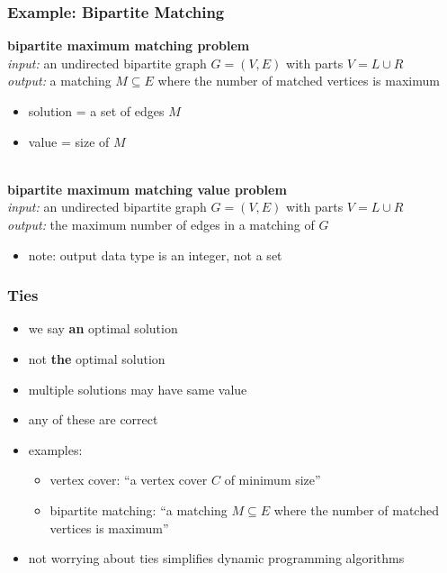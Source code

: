 \documentclass{beamer}
\newcommand{\stanza}{ \\~\ }
\begin{document}
\begin{frame} \frametitle{Example: Bipartite Matching}
  \textbf{bipartite maximum matching problem} \\
  \emph{input:} an undirected bipartite graph $G=(V, E)$ with parts $V=L \cup R$ \\
  \emph{output:} a matching $M \subseteq E$ where the number of matched vertices
    is maximum    
  \begin{itemize}
    \item solution = a set of edges $M$
    \item value = size of $M$ \stanza
  \end{itemize}
  
  \textbf{bipartite maximum matching value problem} \\
  \emph{input:} an undirected bipartite graph $G=(V, E)$ with parts $V=L \cup R$ \\
  \emph{output:} the maximum number of edges in a matching of $G$ 
  \begin{itemize}
    \item note: output data type is an integer, not a set
  \end{itemize}
  \end{frame}
  
\begin{frame} \frametitle{Ties}
  \begin{itemize}
  \item we say \textbf{an} optimal solution
  \item not \textbf{the} optimal solution
  \item multiple solutions may have same value
  \item any of these are correct
  \item examples:
  \begin{itemize}
    \item vertex cover: ``a vertex cover $C$ of minimum size''
    \item bipartite matching: ``a matching $M \subseteq E$ where the number of matched vertices
    is maximum''
  \end{itemize}
  \item not worrying about ties simplifies dynamic programming algorithms
\end{itemize}
\end{frame}
\end{document}

